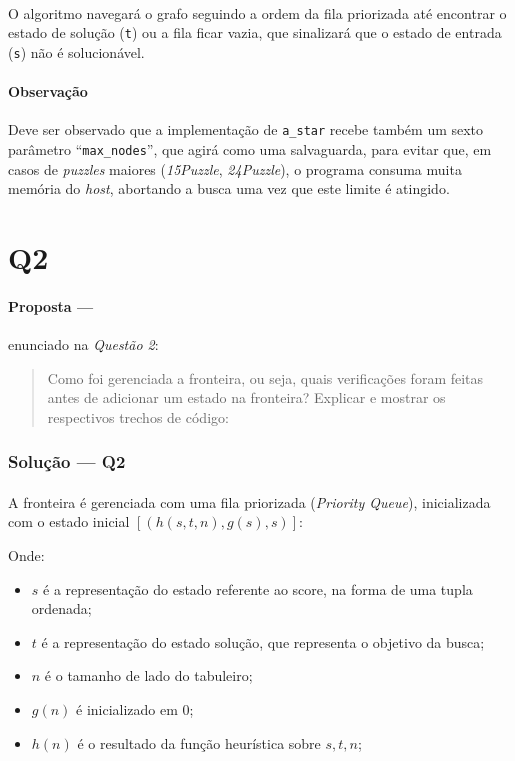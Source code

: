\documentclass[12pt]{article}
\begin{document}
\paragraph{}
O algoritmo navegará o grafo seguindo a ordem da fila priorizada até encontrar o estado de solução (\texttt{t}) ou a
fila ficar vazia, que sinalizará que o estado de entrada (\texttt{s}) não é solucionável.

\paragraph{Observação}
Deve ser observado que a implementação de \texttt{a\_star} recebe também um sexto parâmetro ``\texttt{max\_nodes}'', que
agirá como uma salvaguarda, para evitar que, em casos de \textit{puzzles} maiores (\textit{15Puzzle},
\textit{24Puzzle}), o programa consuma muita memória do \textit{host}, abortando a busca uma vez que este limite é
atingido.

\newpage

\section{Q2}

\paragraph{Proposta ---} enunciado na \textit{Questão 2}:

\begin{quote}
Como foi gerenciada a fronteira, ou seja, quais verificações foram feitas antes de adicionar um estado na fronteira? Explicar e mostrar os respectivos trechos de código:
\end{quote}

\subsubsection{Solução --- \textbf{Q2}}

\paragraph{}
A fronteira é gerenciada com uma fila priorizada (\textit{Priority Queue}), inicializada com o estado inicial $\left[ \left( h(s, t, n), g(s), s \right) \right]$:

Onde:
\begin{itemize}
  \item $s$ é a representação do estado referente ao score, na forma de uma tupla ordenada;
  \item $t$ é a representação do estado solução, que representa o objetivo da busca;
  \item $n$ é o tamanho de lado do tabuleiro;
  \item $g(n)$ é inicializado em 0;
  \item $h(n)$ é o resultado da função heurística sobre $s, t, n$;
\end{itemize}
\end{document}
